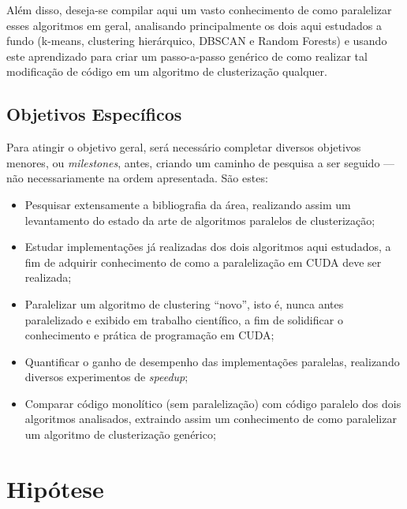 \documentclass[12pt, %
openright, 
oneside, %
a4paper,    %
brazil]{facom-ufu-abntex2}
\def\qntAlgrtm{dois}
\begin{document}
Além disso, deseja-se compilar aqui um vasto conhecimento de como paralelizar esses algoritmos em geral, analisando principalmente os \qntAlgrtm{} aqui estudados a fundo (k-means, clustering hierárquico, DBSCAN e Random Forests) e usando este aprendizado para criar um passo-a-passo genérico de como realizar tal modificação de código em um algoritmo de clusterização qualquer.

\subsection{Objetivos Específicos}

Para atingir o objetivo geral, será necessário completar diversos objetivos menores, ou \textit{milestones}, antes, criando um caminho de pesquisa a ser seguido --- não necessariamente na ordem apresentada. São estes:

\begin{itemize}
    \item Pesquisar extensamente a bibliografia da área, realizando assim um levantamento do estado da arte de algoritmos paralelos de clusterização;
    \item Estudar implementações já realizadas dos \qntAlgrtm{} algoritmos aqui estudados, a fim de adquirir conhecimento de como a paralelização em CUDA deve ser realizada;
    \item Paralelizar um algoritmo de clustering \enquote{novo}, isto é, nunca antes paralelizado e exibido em trabalho científico, a fim de solidificar o conhecimento e prática de programação em CUDA;
    \item Quantificar o ganho de desempenho das implementações paralelas, realizando diversos experimentos de \textit{speedup};
    \item Comparar código monolítico (sem paralelização) com código paralelo dos \qntAlgrtm{} algoritmos analisados, extraindo assim um conhecimento de como paralelizar um algoritmo de clusterização genérico;
\end{itemize}





\section{Hipótese}
\end{document}
